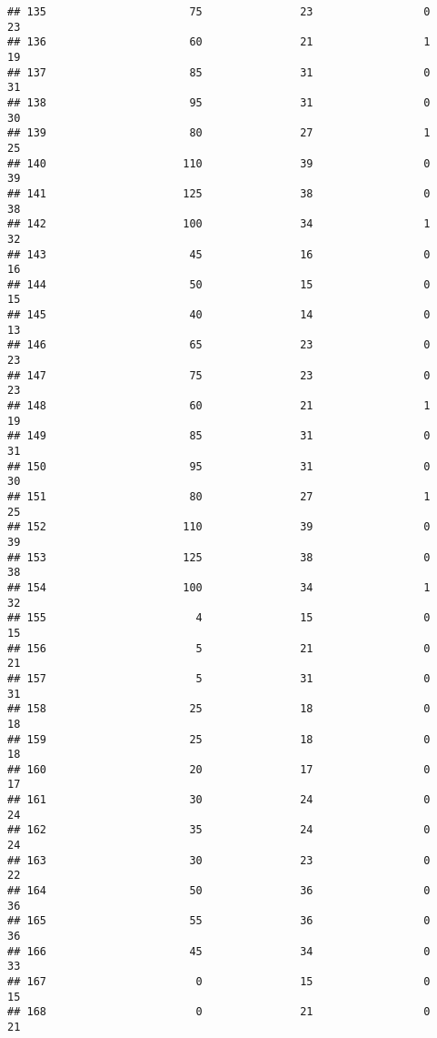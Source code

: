 \documentclass[
]{article}
\begin{document}
\begin{verbatim}
## 135                      75               23                 0         23
## 136                      60               21                 1         19
## 137                      85               31                 0         31
## 138                      95               31                 0         30
## 139                      80               27                 1         25
## 140                     110               39                 0         39
## 141                     125               38                 0         38
## 142                     100               34                 1         32
## 143                      45               16                 0         16
## 144                      50               15                 0         15
## 145                      40               14                 0         13
## 146                      65               23                 0         23
## 147                      75               23                 0         23
## 148                      60               21                 1         19
## 149                      85               31                 0         31
## 150                      95               31                 0         30
## 151                      80               27                 1         25
## 152                     110               39                 0         39
## 153                     125               38                 0         38
## 154                     100               34                 1         32
## 155                       4               15                 0         15
## 156                       5               21                 0         21
## 157                       5               31                 0         31
## 158                      25               18                 0         18
## 159                      25               18                 0         18
## 160                      20               17                 0         17
## 161                      30               24                 0         24
## 162                      35               24                 0         24
## 163                      30               23                 0         22
## 164                      50               36                 0         36
## 165                      55               36                 0         36
## 166                      45               34                 0         33
## 167                       0               15                 0         15
## 168                       0               21                 0         21

\end{verbatim}
\end{document}
